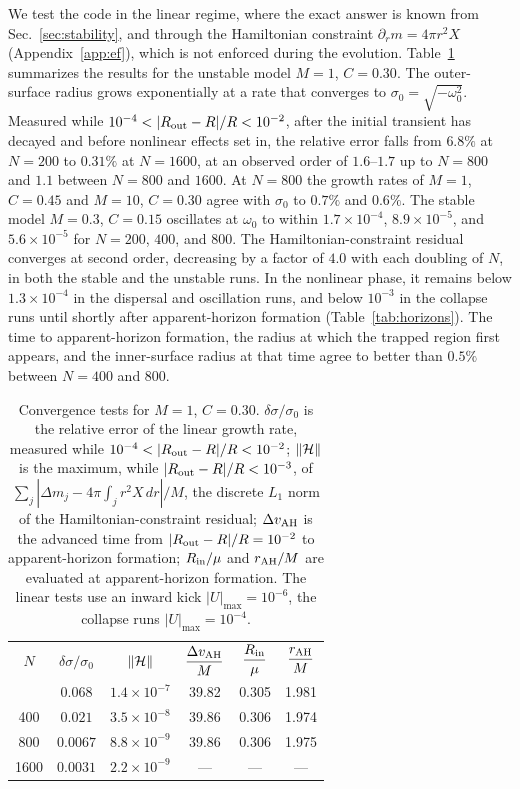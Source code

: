 \documentclass[%
 reprint,
 amsmath,amssymb,
 aps,prd,
 superscriptaddress,
]{revtex4-2}
\begin{document}
We test the code in the linear regime, where the exact answer is known from Sec.~\ref{sec:stability}, and through the Hamiltonian constraint $\partial_rm=4\pi r^2X$ (Appendix~\ref{app:ef}), which is not enforced during the evolution. Table~\ref{tab:convergence} summarizes the results for the unstable model $M=1$, $C=0.30$. The outer-surface radius grows exponentially at a rate that converges to $\sigma_0=\sqrt{-\omega_0^2}$. Measured while $10^{-4}<|R_{\rm out}-R|/R<10^{-2}$, after the initial transient has decayed and before nonlinear effects set in, the relative error falls from $6.8\%$ at $N=200$ to $0.31\%$ at $N=1600$, at an observed order of $1.6$--$1.7$ up to $N=800$ and $1.1$ between $N=800$ and $1600$. At $N=800$ the growth rates of $M=1$, $C=0.45$ and $M=10$, $C=0.30$ agree with $\sigma_0$ to $0.7\%$ and $0.6\%$. The stable model $M=0.3$, $C=0.15$ oscillates at $\omega_0$ to within $1.7\times10^{-4}$, $8.9\times10^{-5}$, and $5.6\times10^{-5}$ for $N=200$, $400$, and $800$. The Hamiltonian-constraint residual converges at second order, decreasing by a factor of $4.0$ with each doubling of $N$, in both the stable and the unstable runs. In the nonlinear phase, it remains below $1.3\times10^{-4}$ in the dispersal and oscillation runs, and below $10^{-3}$ in the collapse runs until shortly after apparent-horizon formation (Table~\ref{tab:horizons}). The time to apparent-horizon formation, the radius at which the trapped region first appears, and the inner-surface radius at that time agree to better than $0.5\%$ between $N=400$ and $800$.

\begin{table}[htbp]
\caption{Convergence tests for $M=1$, $C=0.30$. $\delta\sigma/\sigma_0$ is the relative error of the linear growth rate, measured while $10^{-4}<|R_{\rm out}-R|/R<10^{-2}$; $\|{\cal H}\|$ is the maximum, while $|R_{\rm out}-R|/R<10^{-3}$, of $\sum_j|\Delta m_j-4\pi\int_j r^2X\,dr|/M$, the discrete $L_1$ norm of the Hamiltonian-constraint residual; $\Delta v_{\rm AH}$ is the advanced time from $|R_{\rm out}-R|/R=10^{-2}$ to apparent-horizon formation; $R_{\rm in}/\mu$ and $r_{\rm AH}/M$ are evaluated at apparent-horizon formation. The linear tests use an inward kick $|U|_{\max}=10^{-6}$, the collapse runs $|U|_{\max}=10^{-4}$.}
\label{tab:convergence}
\setlength{\tabcolsep}{3pt}
\begin{ruledtabular}
\begin{tabular}{cccccc}
$N$ & $\delta\sigma/\sigma_0$ & $\|{\cal H}\|$ & $\dfrac{\Delta v_{\rm AH}}{M}$ & $\dfrac{R_{\rm in}}{\mu}$ & $\dfrac{r_{\rm AH}}{M}$ \\[6pt]
\colrule
200 & $0.068$ & $1.4\times10^{-7}$ & 39.82 & 0.305 & 1.981 \\
400 & $0.021$ & $3.5\times10^{-8}$ & 39.86 & 0.306 & 1.974 \\
800 & $0.0067$ & $8.8\times10^{-9}$ & 39.86 & 0.306 & 1.975 \\
1600 & $0.0031$ & $2.2\times10^{-9}$ & --- & --- & --- \\
\end{tabular}
\end{ruledtabular}
\end{table}
\end{document}
